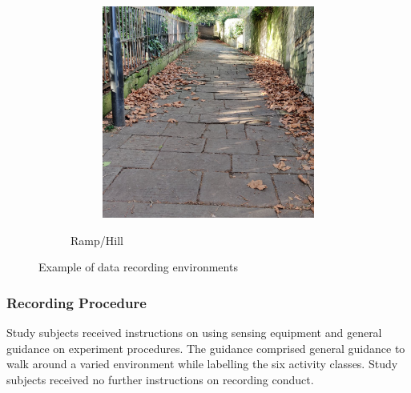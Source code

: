 \begin{figure}[!hbtp]
\begin{subfigure}[b]{\textwidth}
\begin{subfigure}[b]{0.32\textwidth}
        \end{subfigure}
        \hfill
        \begin{subfigure}[b]{0.32\textwidth}
             \centering
             \includegraphics[width=\textwidth]{content/3-Methods/enviroments/ramp_3_modified.jpg}
        \end{subfigure}
        \caption{Ramp/Hill}
        \label{fig:methods-ramp-example}
      \end{subfigure}
    \caption{Example of data recording environments}
    \label{fig:methods-example-enviroments}
\end{figure}

\subsubsection{Recording Procedure} %
Study subjects received instructions on using sensing equipment and general guidance on experiment procedures. The guidance comprised general guidance to walk around a varied environment while labelling the six activity classes. Study subjects received no further instructions on recording conduct.



